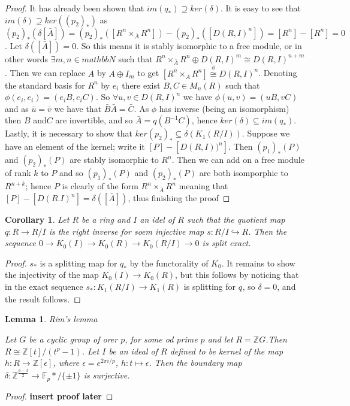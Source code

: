 \documentclass[a4paper,10pt]{article}
\newtheorem{lem}[thm]{Lemma}
\newtheorem{cor}[thm]{Corollary}
\begin{document}
\begin{proof}
\newline It has already been shown that $im(q_{*})\supseteq ker(\delta )$. It is easy to see that $im(\delta )\supseteq ker((p_{2})_{*})$ as $(p_{2})_{*}(\delta [\bar{A}])=(p_{2})_{*}([R^{n}\times_{\bar{A}} R^{n}])-(p_{2})_{*}([D(R,I)^{n}])=[R^{n}]-[R^{n}]=0$.
\newline Let $\delta ([\bar{A}])=0$. So this means it is stably isomorphic to a free module, or in other words $\exists m,n\in mathbb{N}$ such that $R^{n}\times_{\bar{A}} R^{n}\oplus D(R,I)^{m}\cong D(R,I)^{n+m}$. Then we can replace $A$ by $A\oplus I_{m}$ to get $[R^{n}\times_{\bar{A}} R^{n}]\stackrel{\phi}{\cong} D(R,I)^{n}$. Denoting the standard basis for $R^{n}$ by $e_{i}$ there exist $B,C\in M_{n}(R)$ such that $\phi(e_{i},e_{i})=(e_{i}B,e_{i}C)$. So $\forall u,v\in D(R,I)^{n}$ we have $\phi(u,v)=(uB,vC)$ and as $\bar{u}=\bar{v}$ we have that $\bar{B}\bar{A}=\bar{C}$. As $\phi$ has inverse (being an isomorphism) then $B$ and$C$ are invertible, and so $\bar{A}=q(B^{-1}C)$, hence $ker(\delta )\subseteq im(q_{*})$.
\newline Lastly, it is necessary to show that $ker(p_{2})_{*}\subseteq \delta (K_{1}(R/I))$. Suppose we have an element of the kernel; write it $[P]-[D(R,I))^{n}]$. Then $(p_{1})_{*}(P)$ and $(p_{2})_{*}(P)$ are stably isomorphic to $R^{n}$. Then we can add on a free module of rank $k$ to $P$ and so $(p_{1})_{*}(P)$ and $(p_{2})_{*}(P)$ are both isomporphic to $R^{n+k}$; hence $P$ is clearly of the form $R^{n}\times_{\bar{A}} R^{n}$ meaning that $[P]-[D(R.I)^{n}]=\delta ([\bar{A}])$, thus finishing the proof
\end{proof}

\begin{cor}
Let $R$ be a ring and $I$ an idel of $R$ such that the quotient map $q:R\rightarrow R/I$ is the right inverse for soem injective map $s:R/I\hookrightarrow R$. Then the sequence $0\rightarrow K_{0}(I)\rightarrow K_{0}(R)\rightarrow K_{0}(R/I)\rightarrow 0$ is split exact.
\end{cor}
\begin{proof}
$s_{*}$ is a splitting map for $q_{*}$ by the functorality of $K_{0}$. It remains to show the injectivity of the map $K_{0}(I)\rightarrow K_{0}(R)$, but this follows by noticing that in the exact sequence $s_{*}:K_{1}(R/I)\rightarrow K_{1}(R)$ is splitting for $q_{}$, so $\delta =0$, and the result follows.
\end{proof}

\begin{lem}{Rim's lemma}

Let $G$ be a cyclic group of orer $p$, for some od prime $p$ and let $R=\mathbb{Z}G$.Then $R\cong \mathbb{Z}[t]/(t^{p}-1)$. Let $I$ be an ideal of $R$ defined to be kernel of the map $h:R\rightarrow \mathbb{Z}[\epsilon]$, where $\epsilon = e^{2\pi i/p}$, $h:t\mapsto \epsilon$. Then the boundary map $\delta :\mathbb{Z}^{\frac{p-3}{2}}\rightarrow \mathbb{F}_{p}*/\{\pm 1\}$ is surjective.
\end{lem}
\begin{proof}
\textbf{insert proof later}
\end{proof}
\end{document}
